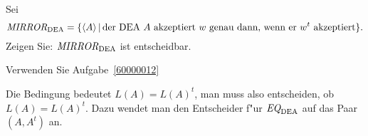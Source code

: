 Sei
\[
\text{\it MIRROR}_{\text{DEA}}
= \{\langle A\rangle\,|\,
\text{der DEA $A$ akzeptiert $w$ genau dann, wenn er $w^t$ akzeptiert}\}.
\]
Zeigen Sie: $\text{\it MIRROR}_\text{DEA}$ ist entscheidbar.

\begin{hinweis}
Verwenden Sie Aufgabe~\ref{60000012}
\end{hinweis}

\begin{loesung}
Die Bedingung bedeutet $L(A)=L(A)^t$, man muss also entscheiden,
ob $L(A)=L(A)^t$. Dazu wendet man den Entscheider f"ur
$\text{\it EQ}_{\text{DEA}}$ auf das Paar $(A,A^t)$ an.
\end{loesung}
